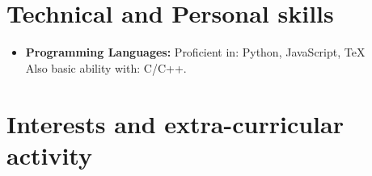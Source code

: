 \documentclass[11pt,a4paper,sans]{moderncv}        %
\begin{document}
\vspace{2pt}









\section{Technical and Personal skills}

\vspace{6pt}

\begin{itemize}

\item \textbf{Programming Languages:} Proficient in: Python, JavaScript, \TeX \\ Also basic ability with: C/C++.

\vspace{6pt}



\end{itemize}

\section{Interests and extra-curricular activity}

\vspace{6pt}
\end{document}
